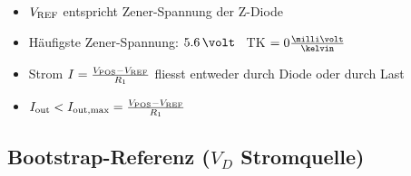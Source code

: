 \begin{minipage}[c]{0.78\columnwidth}
    \begin{itemize}
        \item $V_{\rm REF}$ entspricht Zener-Spannung der Z-Diode
        \item Häufigste Zener-Spannung: $5.6 \, \volt$ \textrightarrow\ TK $= 0 \frac{\milli \volt}{\kelvin}$
        \item Strom $I = \frac{V_{\rm POS} - V_{\rm REF}}{R_1}$ fliesst entweder durch Diode oder durch Last
        \item $I_{\rm out} < I_{\rm out, max} = \frac{V_{\rm POS} - V_{\rm REF}}{R_1}$
    \end{itemize}

\end{minipage}


\subsection[Bootstrap-Referenz (VD Stromquelle)]{Bootstrap-Referenz ($V_D$ Stromquelle)}

